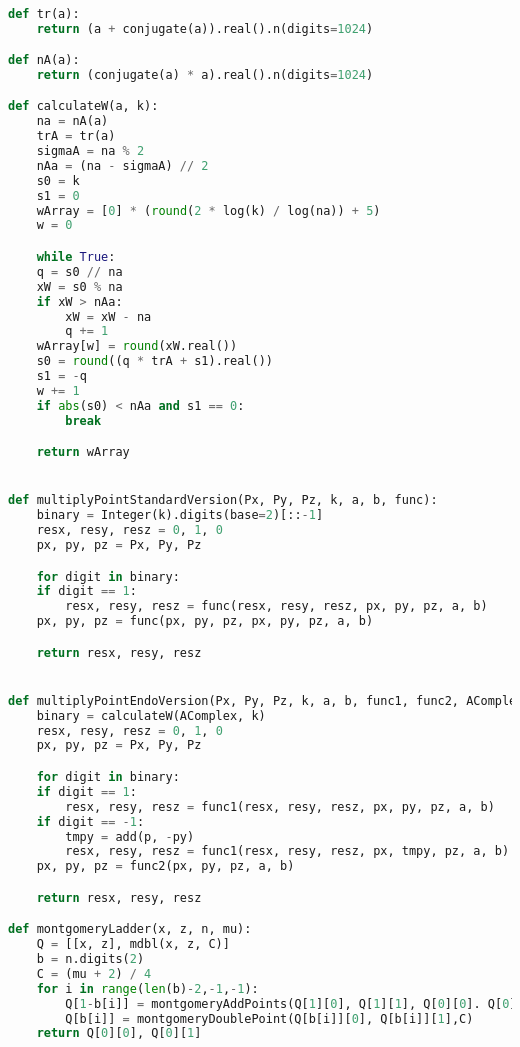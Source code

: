 \begin{lstlisting}[language=python]

def tr(a):
    return (a + conjugate(a)).real().n(digits=1024)

def nA(a):
    return (conjugate(a) * a).real().n(digits=1024)

def calculateW(a, k):
    na = nA(a)
    trA = tr(a)
    sigmaA = na % 2
    nAa = (na - sigmaA) // 2
    s0 = k
    s1 = 0
    wArray = [0] * (round(2 * log(k) / log(na)) + 5)
    w = 0

    while True:
    q = s0 // na
    xW = s0 % na
    if xW > nAa:
        xW = xW - na
        q += 1
    wArray[w] = round(xW.real())
    s0 = round((q * trA + s1).real())
    s1 = -q
    w += 1
    if abs(s0) < nAa and s1 == 0:
        break

    return wArray


def multiplyPointStandardVersion(Px, Py, Pz, k, a, b, func):
    binary = Integer(k).digits(base=2)[::-1]
    resx, resy, resz = 0, 1, 0
    px, py, pz = Px, Py, Pz

    for digit in binary:
    if digit == 1:
        resx, resy, resz = func(resx, resy, resz, px, py, pz, a, b)
    px, py, pz = func(px, py, pz, px, py, pz, a, b)

    return resx, resy, resz


def multiplyPointEndoVersion(Px, Py, Pz, k, a, b, func1, func2, AComplex, p):
    binary = calculateW(AComplex, k)
    resx, resy, resz = 0, 1, 0
    px, py, pz = Px, Py, Pz

    for digit in binary:
    if digit == 1:
        resx, resy, resz = func1(resx, resy, resz, px, py, pz, a, b)
    if digit == -1:
        tmpy = add(p, -py)
        resx, resy, resz = func1(resx, resy, resz, px, tmpy, pz, a, b)
    px, py, pz = func2(px, py, pz, a, b)

    return resx, resy, resz

def montgomeryLadder(x, z, n, mu):
    Q = [[x, z], mdbl(x, z, C)]
    b = n.digits(2)
    C = (mu + 2) / 4
    for i in range(len(b)-2,-1,-1):
        Q[1-b[i]] = montgomeryAddPoints(Q[1][0], Q[1][1], Q[0][0]. Q[0][1], x, z)
        Q[b[i]] = montgomeryDoublePoint(Q[b[i]][0], Q[b[i]][1],C)
    return Q[0][0], Q[0][1]


\end{lstlisting}